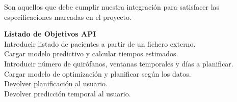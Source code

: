 Son aquellos que debe cumplir nuestra integración para satisfacer las especificaciones marcadas en el proyecto.

{\textbf{Listado de Objetivos API}\\}{ 
 Introducir listado de pacientes a partir de un fichero externo. \\
 Cargar modelo predictivo y calcular tiempos estimados. \\
 Introducir número de quirófanos, ventanas temporales y días a planificar. \\
 Cargar modelo de optimización y planificar según los datos.\\
 Devolver planificación al usuario.\\
 Devolver predicción temporal al usuario. \\
 } 
